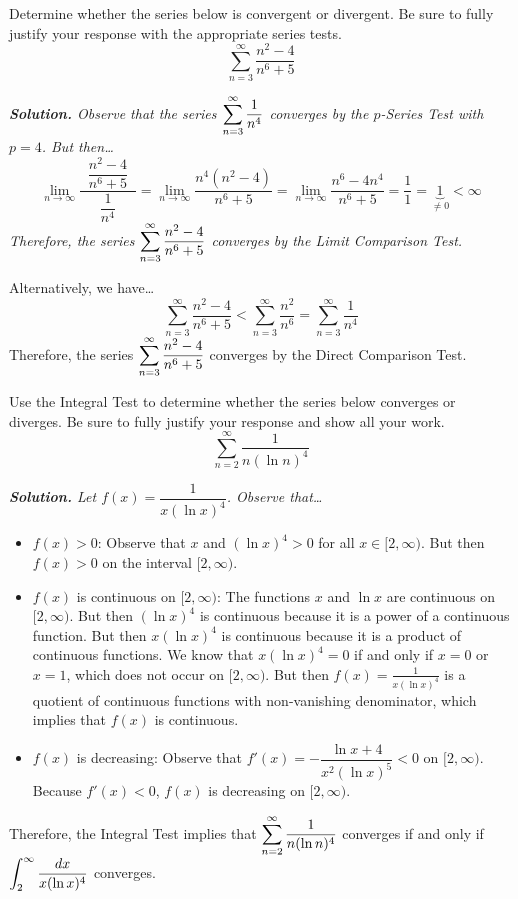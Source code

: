 \documentclass[12pt,letterpaper]{exam}
\begin{document}
\begin{questions}
\newpage
\question[10] Determine whether the series below is convergent or divergent. Be sure to fully justify your response with the appropriate series tests.
	\[
	\sum_{n=3}^\infty \dfrac{n^2 - 4}{n^6 + 5}
	\] \pspace

{\itshape \textbf{Solution.} Observe that the series $\displaystyle\sum_{n=3}^\infty \dfrac{1}{n^4}$ converges by the $p$-Series Test with $p= 4$. But then\dots
	\[
	\lim_{n \to \infty} \dfrac{\;\;\dfrac{n^2 - 4}{n^6 + 5}\;\;}{\dfrac{1}{n^4}}= \lim_{n \to \infty} \dfrac{n^4(n^2 - 4)}{n^6 + 5}= \lim_{n \to \infty} \dfrac{n^6 - 4n^4}{n^6 + 5}= \dfrac{1}{1}= \underbrace{1}_{\neq 0} < \infty
	\]
Therefore, the series $\displaystyle\sum_{n=3}^\infty \dfrac{n^2 - 4}{n^6 + 5}$ converges by the Limit Comparison Test. \pspace

Alternatively, we have\dots
	\[
	\sum_{n=3}^\infty \dfrac{n^2 - 4}{n^6 + 5} < \sum_{n=3}^\infty \dfrac{n^2}{n^6}= \sum_{n=3}^\infty \dfrac{1}{n^4}
	\]
Therefore, the series $\displaystyle\sum_{n=3}^\infty \dfrac{n^2 - 4}{n^6 + 5}$ converges by the Direct Comparison Test.}



\newpage
\question[15] Use the Integral Test to determine whether the series below converges or diverges. Be sure to fully justify your response and show all your work. 
	\[
	\sum_{n=2}^\infty \dfrac{1}{n (\ln n)^4}
	\] \pspace

{\itshape \textbf{Solution.} Let $f(x)= \dfrac{1}{x (\ln x)^4}$. Observe that\dots
	\begin{itemize}
	\item $f(x) > 0$: Observe that $x$ and $(\ln x)^4 > 0$ for all $x \in [2, \infty)$. But then $f(x) > 0$ on the interval $[2, \infty)$.
	\item $f(x)$ is continuous on $[2, \infty)$: The functions $x$ and $\ln x$ are continuous on $[2, \infty)$. But then $(\ln x)^4$ is continuous because it is a power of a continuous function. But then $x (\ln x)^4$ is continuous because it is a product of continuous functions. We know that $x (\ln x)^4= 0$ if and only if $x= 0$ or $x= 1$, which does not occur on $[2, \infty)$. But then $f(x)= \frac{1}{x (\ln x)^4}$ is a quotient of continuous functions with non-vanishing denominator, which implies that $f(x)$ is continuous.
	\item $f(x)$ is decreasing: Observe that $f'(x)= - \dfrac{\ln x + 4}{x^2 (\ln x)^5} < 0$ on $[2, \infty)$. Because $f'(x) < 0$, $f(x)$ is decreasing on $[2, \infty)$. 
	\end{itemize}
Therefore, the Integral Test implies that $\displaystyle\sum_{n=2}^\infty \dfrac{1}{n (\ln n)^4}$ converges if and only if $\displaystyle\int_2^\infty \dfrac{dx}{x (\ln x)^4}$ converges. \pspace

}
\end{questions}
\end{document}

